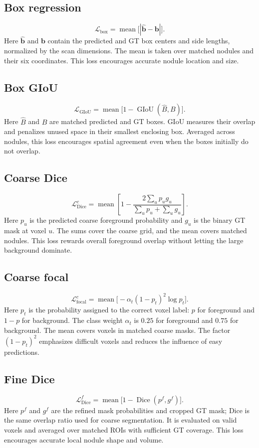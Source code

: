 \documentclass[11pt,a4paper]{article}
\newcommand{\loss}[1]{\mathcal L_{\mathrm{#1}}}
\newcommand{\mean}{\operatorname{mean}}
\newcommand{\Dice}{\operatorname{Dice}}
\newcommand{\GIoU}{\operatorname{GIoU}}
\newcommand{\lossheading}[1]{\subsection{#1}}
\newenvironment{lossblock}[1]{%
  \par\addvspace{3pt}\noindent\begin{minipage}{\textwidth}%
  \lossheading{#1}%
}{\end{minipage}\par}
\begin{document}
\begin{lossblock}{Box regression}
\[
  \loss{box}=\mean\bigl[|\widehat{\mathbf b}-\mathbf b|\bigr].
\]
Here $\widehat{\mathbf b}$ and $\mathbf b$ contain the predicted and GT box
centers and side lengths, normalized by the scan dimensions. The mean
is taken over matched nodules and their six coordinates.
This loss encourages accurate nodule location and size.
\end{lossblock}

\begin{lossblock}{Box GIoU}
\[
  \loss{GIoU}=\mean\bigl[1-\GIoU(\widehat B,B)\bigr].
\]
Here $\widehat B$ and $B$ are matched predicted and GT boxes.
GIoU measures their overlap and penalizes unused space in their smallest
enclosing box. Averaged across nodules, this loss encourages spatial
agreement even when the boxes initially do not overlap.
\end{lossblock}

\begin{lossblock}{Coarse Dice}
\[
  \loss{Dice}^{c}
  =\mean\left[1-\frac{2\sum_u p_u g_u}
                         {\sum_u p_u+\sum_u g_u}\right].
\]
Here $p_u$ is the predicted coarse foreground probability and $g_u$ is the
binary GT mask at voxel $u$. The sums cover the coarse grid, and the mean
covers matched nodules. This loss rewards overall foreground overlap
without letting the large background dominate.
\end{lossblock}

\begin{lossblock}{Coarse focal}
\[
  \loss{focal}^{c}
  =\mean\bigl[-\alpha_t(1-p_t)^2\log p_t\bigr].
\]
Here $p_t$ is the probability assigned to the correct voxel label:
$p$ for foreground and $1-p$ for background. The class weight $\alpha_t$
is $0.25$ for foreground and $0.75$ for background. The mean covers voxels
in matched coarse masks. The factor $(1-p_t)^2$ emphasizes difficult
voxels and reduces the influence of easy predictions.
\end{lossblock}

\begin{lossblock}{Fine Dice}
\[
  \loss{Dice}^{f}=\mean\bigl[1-\Dice(p^f,g^f)\bigr].
\]
Here $p^f$ and $g^f$ are the refined mask probabilities and cropped GT mask;
Dice is the same overlap ratio used for coarse segmentation. It is evaluated on
valid voxels and averaged over matched ROIs with sufficient GT coverage.
This loss encourages accurate local nodule shape and volume.
\end{lossblock}
\end{document}
